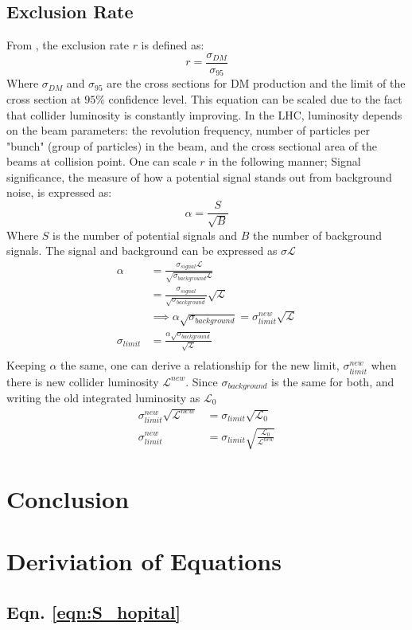 \documentclass[12pt]{article}
\begin{document}
\subsection{Exclusion Rate}
From \cite{Aruhrib2012Inert}, the exclusion rate $r$ is defined as:
\begin{equation}
    r = \frac{\sigma_{DM}}{\sigma_{95}}
\end{equation}
Where $\sigma_{DM}$ and $\sigma_{95}$ are the cross sections for DM production and the limit of the cross section at $95\%$ confidence level. This equation can be scaled due to the fact that collider luminosity is constantly improving. In the LHC, luminosity depends on the beam parameters: the revolution frequency, number of particles per "bunch" (group of particles) in the beam, and the cross sectional area of the beams at collision point. One can scale $r$ in the following manner;
Signal significance, the measure of how a potential signal stands out from background noise, is expressed as:
\begin{equation}
    \alpha = \frac{S}{\sqrt{B}}
\end{equation}
Where $S$ is the number of potential signals and $B$ the number of background signals. The signal and background can be expressed as $\sigma \mathcal{L}$
\begin{equation}
    \begin{split}
        \alpha &= \frac{\sigma_{signal} \mathcal{L}}{\sqrt{\sigma_{background }\mathcal{L}}}
        \\&= \frac{\sigma_{signal}}{\sqrt{\sigma_{background}}} \sqrt{\mathcal{L}}
        \\&\implies \alpha \sqrt{\sigma_{background}} = \sigma_{limit}^{new}\sqrt{\mathcal{L}}
        \\\sigma_{limit} &=\frac{\alpha \sqrt{\sigma_{background}}}{\sqrt{\mathcal{L}}}  
        \\
    \end{split}
\end{equation}
Keeping $\alpha$ the same, one can derive a relationship for the new limit, $\sigma_{limit}^{new}$ when there is new collider luminosity $\mathcal{L}^{new}$. Since $\sigma_{background}$ is the same for both, and writing the old integrated luminosity as $\mathcal{L}_0$ 
\begin{equation}
    \begin{split}
    \sigma_{limit}^{new} \sqrt{\mathcal{L}^{new}} &= \sigma_{limit}\sqrt{\mathcal{L}_0}
        \\ \sigma_{limit}^{new}&= \sigma_{limit}\sqrt{\frac{\mathcal{L}_0}{\mathcal{L}^{new}}}
    \end{split}
\end{equation}

\section{Conclusion}
\label{sec:conclusion}

\onecolumn
\newpage



\appendix
\section{Deriviation of Equations}
\subsection{Eqn. \ref{eqn:S_hopital}}
\end{document}
